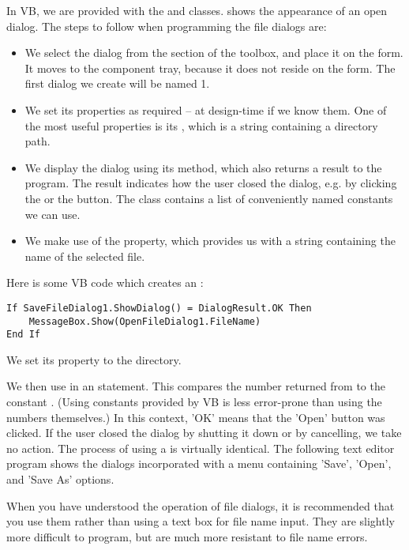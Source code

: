 		In VB, we are provided with the  and  classes.  shows the appearance of an open dialog. The steps to follow when programming the file dialogs are:
		\begin{itemize}
			\item We select the dialog from the  section of the toolbox, and place it on the form. It moves to the component tray, because it does not reside on the form. The first dialog we create will be named 1.
      \item We set its properties as required – at design-time if we know them. One of the most useful properties is its , which is a string containing a directory path.
			\item We display the dialog using its  method, which also returns a result to the program. The result indicates how the user closed the dialog, e.g. by clicking the  or the  button. The  class contains a list of conveniently named constants we can use.
      \item We make use of the  property, which provides us with a string containing the name of the selected file.
		\end{itemize}
		Here is some VB code which creates an :
		\begin{lstlisting}
If SaveFileDialog1.ShowDialog() = DialogResult.OK Then
	MessageBox.Show(OpenFileDialog1.FileName)
End If
		\end{lstlisting}
		We set its  property to the  directory.
		
		We then use  in an  statement. This compares the number returned from  to the constant . (Using constants provided by VB is less error-prone than using the numbers themselves.) In this context, 'OK' means that the 'Open' button was clicked. If the user closed the dialog by shutting it down or by cancelling, we take no action. The process of using a  is virtually identical. The following text editor program shows the dialogs incorporated with a menu containing 'Save', 'Open', and 'Save As' options.
		
		When you have understood the operation of file dialogs, it is recommended that you use them rather than using a text box for file name input. They are slightly more difficult to program, but are much more resistant to file name errors.



